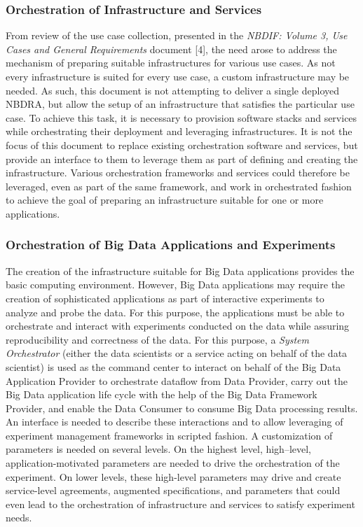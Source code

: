 \documentclass[9pt,]{article}
\begin{document}
\hypertarget{orchestration-of-infrastructure-and-services}{%
\subsubsection{Orchestration of Infrastructure and
Services}\label{orchestration-of-infrastructure-and-services}}

From review of the use case collection, presented in the \emph{NBDIF:
Volume 3, Use Cases and General Requirements} document {[}4{]}, the need
arose to address the mechanism of preparing suitable infrastructures for
various use cases. As not every infrastructure is suited for every use
case, a custom infrastructure may be needed. As such, this document is
not attempting to deliver a single deployed NBDRA, but allow the setup
of an infrastructure that satisfies the particular use case. To achieve
this task, it is necessary to provision software stacks and services
while orchestrating their deployment and leveraging infrastructures. It
is not the focus of this document to replace existing orchestration
software and services, but provide an interface to them to leverage them
as part of defining and creating the infrastructure. Various
orchestration frameworks and services could therefore be leveraged, even
as part of the same framework, and work in orchestrated fashion to
achieve the goal of preparing an infrastructure suitable for one or more
applications.

\hypertarget{orchestration-of-big-data-applications-and-experiments}{%
\subsubsection{Orchestration of Big Data Applications and
Experiments}\label{orchestration-of-big-data-applications-and-experiments}}

The creation of the infrastructure suitable for Big Data applications
provides the basic computing environment. However, Big Data applications
may require the creation of sophisticated applications as part of
interactive experiments to analyze and probe the data. For this purpose,
the applications must be able to orchestrate and interact with
experiments conducted on the data while assuring reproducibility and
correctness of the data. For this purpose, a \emph{System Orchestrator}
(either the data scientists or a service acting on behalf of the data
scientist) is used as the command center to interact on behalf of the
Big Data Application Provider to orchestrate dataflow from Data
Provider, carry out the Big Data application life cycle with the help of
the Big Data Framework Provider, and enable the Data Consumer to consume
Big Data processing results. An interface is needed to describe these
interactions and to allow leveraging of experiment management frameworks
in scripted fashion. A customization of parameters is needed on several
levels. On the highest level, high--level, application-motivated
parameters are needed to drive the orchestration of the experiment. On
lower levels, these high-level parameters may drive and create
service-level agreements, augmented specifications, and parameters that
could even lead to the orchestration of infrastructure and services to
satisfy experiment needs.
\end{document}
